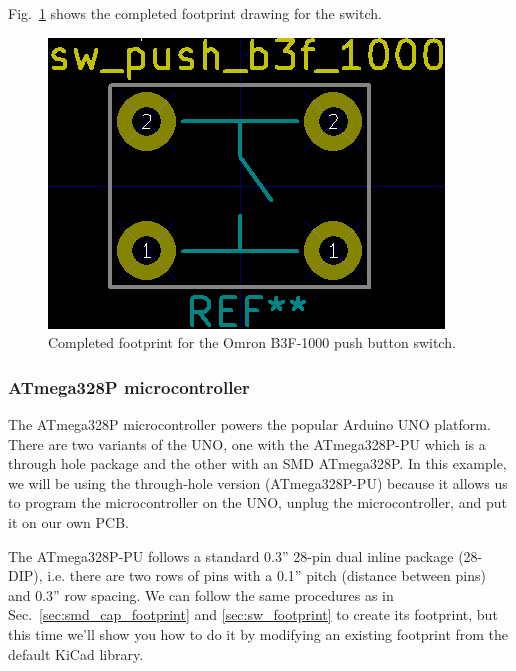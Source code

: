 \documentclass[12pt,letterpaper]{scrartcl}
\begin{document}
Fig.~\ref{fig:switch-footprint-final} shows the completed footprint drawing for the switch. 

	\begin{figure}[hp]
		\centering
		\includegraphics[width=2.in]{switch-footprint-final}
		\caption{Completed footprint for the Omron B3F-1000 push button switch.}
		\label{fig:switch-footprint-final}
	\end{figure}

\subsubsection{ATmega328P microcontroller}

The ATmega328P microcontroller powers the popular Arduino UNO platform. There are two variants of the UNO, one with the ATmega328P-PU which is a through hole package and the other with an SMD ATmega328P. In this example, we will be using the through-hole version (ATmega328P-PU) because it allows us to program the microcontroller on the UNO, unplug the microcontroller, and put it on our own PCB. 

The ATmega328P-PU follows a standard 0.3'' 28-pin dual inline package (28-DIP), i.e. there are two rows of pins with a 0.1'' pitch (distance between pins) and 0.3'' row spacing. We can follow the same procedures as in Sec.~\ref{sec:smd_cap_footprint} and \ref{sec:sw_footprint} to create its footprint, but this time we'll show you how to do it by modifying an existing footprint from the default KiCad library. 
\end{document}

